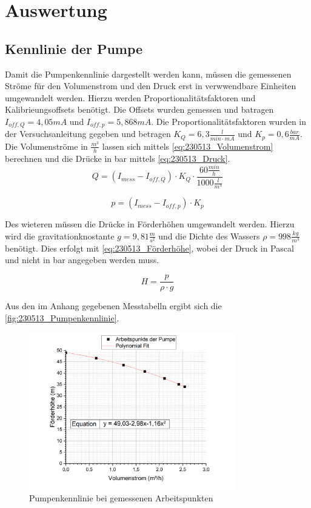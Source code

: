 \section{Auswertung}
\subsection{Kennlinie der Pumpe} \label{sec:230514_Kennlinie_der_Pumpe}
Damit die Pumpenkennlinie dargestellt werden kann, müssen die gemessenen Ströme für den Volumenstrom und den Druck erst in verwwendbare Einheiten umgewandelt werden. 
Hierzu werden Proportionalitätsfaktoren und Kalibrieungsoffsets benötigt. 
Die Offsets wurden gemessen und batragen $I_{off,Q}=4,05 mA$ und $I_{off,p}=5,868 mA$.
Die Proportionalitätsfaktoren wurden in der Versuchsanleitung gegeben und betragen $K_Q = 6,3 \frac{l}{min \cdot mA}$ und $K_p = 0,6 \frac{bar}{mA}$.
Die Volumenströme in $\frac{m^3}{h}$ lassen sich mittels \autoref{eq:230513_Volumenstrom} berechnen und die Drücke in bar mittels \autoref{eq:230513_Druck}.
\begin{equation}
  Q = (I_{mess}-I_{off,Q})\cdot K_Q \cdot \frac{60\frac{min}{h}}{1000\frac{l}{m^3}}
  \label{eq:230513_Volumenstrom}
\end{equation}

\begin{equation}
  p = (I_{mess}-I_{off,p})\cdot K_p
  \label{eq:230513_Druck}
\end{equation}

Des wieteren müssen die Drücke in Förderhöhen umgewandelt werden. Hierzu wird die gravitationknostante $g = 9,81 \frac{m}{s^2}$ und die Dichte des Wassers $\rho = 998 \frac{kg}{m^3}$ benötigt.
Dies erfolgt mit \autoref{eq:230513_Förderhöhe}, wobei der Druck in Pascal und nicht in bar angegeben werden muss.

\begin{equation}
  H = \frac{p}{\rho \cdot g}
  \label{eq:230513_Förderhöhe}
\end{equation}

Aus den im Anhang gegebenen Messtabelln ergibt sich die \autoref{fig:230513_Pumpenkennlinie}.
\begin{figure}[H]
  \centering
  \includegraphics[width=0.8\textwidth]{Abbildungen/Pumpenkennlinie.png}
  \caption{Pumpenkennlinie bei gemessenen Arbeitspunkten}
  \label{fig:230513_Pumpenkennlinie}
\end{figure}

